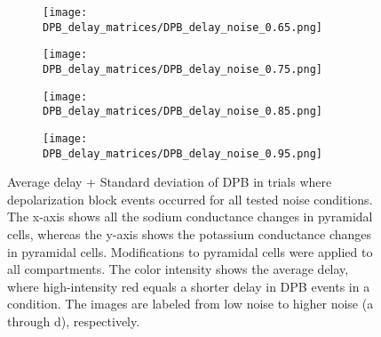 \begin{figure}[H]
    \centering
    \begin{subfigure}{0.48\textwidth}
        \texttt{[image: DPB\_delay\_matrices/DPB\_delay\_noise\_0.65.png]}
        \caption{} %
    \end{subfigure}\hfill
    \begin{subfigure}{0.48\textwidth}
        \texttt{[image: DPB\_delay\_matrices/DPB\_delay\_noise\_0.75.png]}
        \caption{} %
    \end{subfigure}

    \bigskip %

    \begin{subfigure}{0.48\textwidth}
        \texttt{[image: DPB\_delay\_matrices/DPB\_delay\_noise\_0.85.png]}
        \caption{} %
    \end{subfigure}\hfill
    \begin{subfigure}{0.48\textwidth}
        \texttt{[image: DPB\_delay\_matrices/DPB\_delay\_noise\_0.95.png]}
        \caption{} %
    \end{subfigure}

    \caption[DPB delay matrices]{Average delay + Standard deviation of DPB in trials where depolarization block events occurred for all tested noise conditions.
    The x-axis shows all the sodium conductance changes in pyramidal cells, whereas the y-axis shows the potassium conductance changes in pyramidal cells.
    Modifications to pyramidal cells were applied to all compartments.
    The color intensity shows the average delay, where high-intensity red equals a shorter delay in DPB events in a condition.
    The images are labeled from low noise to higher noise (a through d), respectively.}\label{fig:dpb_delay_matrices}
\end{figure}
\pagebreak
